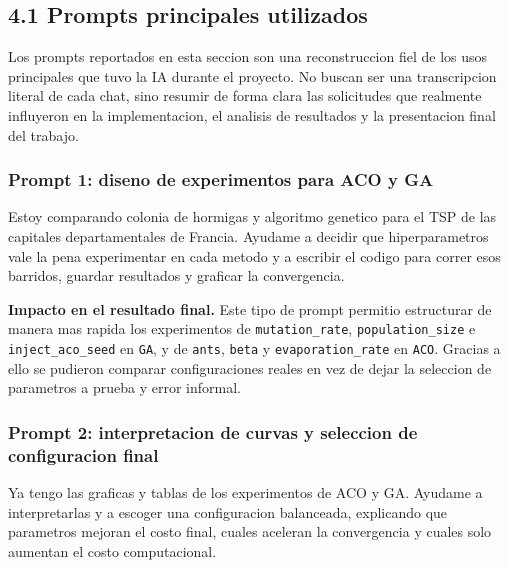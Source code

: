 \documentclass[
  12pt,
  letterpaper,
  DIV=11,
  numbers=noendperiod]{scrartcl}
\newenvironment{Shaded}{\begin{snugshade}}{\end{snugshade}}
\newcommand{\NormalTok}[1]{\textcolor[rgb]{0.00,0.23,0.31}{#1}}
\begin{document}
\subsection{4.1 Prompts principales
utilizados}\label{prompts-principales-utilizados}

Los prompts reportados en esta seccion son una reconstruccion fiel de
los usos principales que tuvo la IA durante el proyecto. No buscan ser
una transcripcion literal de cada chat, sino resumir de forma clara las
solicitudes que realmente influyeron en la implementacion, el analisis
de resultados y la presentacion final del trabajo.

\subsubsection{Prompt 1: diseno de experimentos para ACO y
GA}\label{prompt-1-diseno-de-experimentos-para-aco-y-ga}

\begin{Shaded}
\begin{Highlighting}[]
\NormalTok{Estoy comparando colonia de hormigas y algoritmo genetico para el TSP de las capitales departamentales de Francia. Ayudame a decidir que hiperparametros vale la pena experimentar en cada metodo y a escribir el codigo para correr esos barridos, guardar resultados y graficar la convergencia.}
\end{Highlighting}
\end{Shaded}

\textbf{Impacto en el resultado final.} Este tipo de prompt permitio
estructurar de manera mas rapida los experimentos de
\texttt{mutation\_rate}, \texttt{population\_size} e
\texttt{inject\_aco\_seed} en \texttt{GA}, y de \texttt{ants},
\texttt{beta} y \texttt{evaporation\_rate} en \texttt{ACO}. Gracias a
ello se pudieron comparar configuraciones reales en vez de dejar la
seleccion de parametros a prueba y error informal.

\subsubsection{Prompt 2: interpretacion de curvas y seleccion de
configuracion
final}\label{prompt-2-interpretacion-de-curvas-y-seleccion-de-configuracion-final}

\begin{Shaded}
\begin{Highlighting}[]
\NormalTok{Ya tengo las graficas y tablas de los experimentos de ACO y GA. Ayudame a interpretarlas y a escoger una configuracion balanceada, explicando que parametros mejoran el costo final, cuales aceleran la convergencia y cuales solo aumentan el costo computacional.}
\end{Highlighting}
\end{Shaded}
\end{document}
